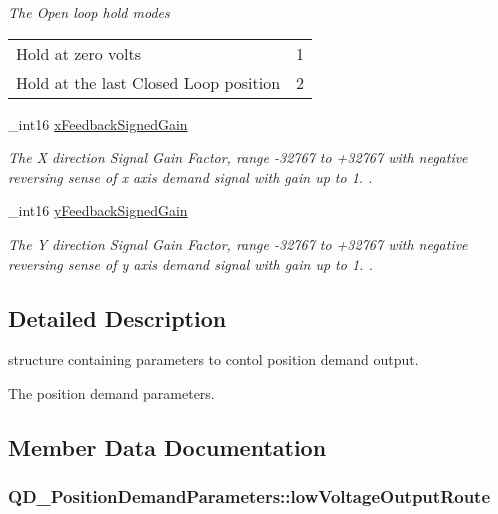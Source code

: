 \begin{DoxyCompactItemize}
\begin{DoxyCompactList}\small\item\em The Open loop hold modes \tabulinesep=1mm
\begin{longtabu} spread 0pt [c]{*2{|X[-1]}|}
\hline
Hold at zero volts&1 \\
Hold at the last Closed Loop position&2 \\
\end{longtabu}
\end{DoxyCompactList}\item 
\+\_\+int16 \hyperlink{struct_q_d___position_demand_parameters_a96dcc5f4e7d7ff259491007b769b4f64}{x\+Feedback\+Signed\+Gain}
\begin{DoxyCompactList}\small\item\em The X direction Signal Gain Factor, range -\/32767 to +32767 with negative reversing sense of x axis demand signal with gain up to 1. . \end{DoxyCompactList}\item 
\+\_\+int16 \hyperlink{struct_q_d___position_demand_parameters_ac3bd6103f0b102e8802fedd565939602}{y\+Feedback\+Signed\+Gain}
\begin{DoxyCompactList}\small\item\em The Y direction Signal Gain Factor, range -\/32767 to +32767 with negative reversing sense of y axis demand signal with gain up to 1. . \end{DoxyCompactList}\end{DoxyCompactItemize}


\subsection{Detailed Description}
structure containing parameters to contol position demand output. 

The position demand parameters. 

\subsection{Member Data Documentation}
\subsubsection[{\texorpdfstring{low\+Voltage\+Output\+Route}{lowVoltageOutputRoute}}]{ Q\+D\+\_\+\+Position\+Demand\+Parameters\+::low\+Voltage\+Output\+Route}\hypertarget{struct_q_d___position_demand_parameters_a58ceb02e61a3d4ebfa168026b7b11585}{}\label{struct_q_d___position_demand_parameters_a58ceb02e61a3d4ebfa168026b7b11585}


